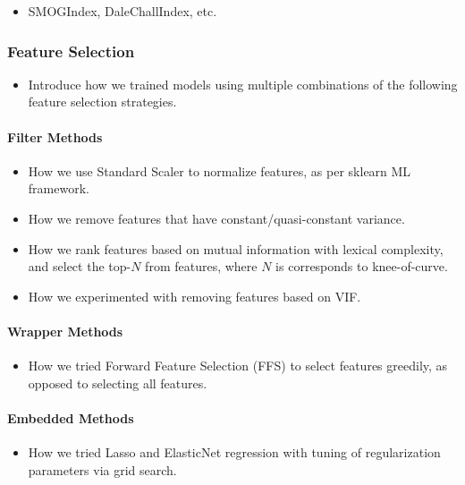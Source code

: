 \documentclass[11pt,a4paper]{article}
\begin{document}
\begin{itemize}
  \item SMOGIndex, DaleChallIndex, etc.
\end{itemize}

\subsubsection{Feature Selection}

\begin{itemize}
  \item Introduce how we trained models using multiple combinations of the following feature selection strategies.
\end{itemize}

\paragraph{Filter Methods}

\begin{itemize}
  \item How we use Standard Scaler to normalize features, as per sklearn ML framework.
  \item How we remove features that have constant/quasi-constant variance.
  \item How we rank features based on mutual information with lexical complexity, and select the top-$N$ from features, where $N$ is corresponds to knee-of-curve.
  \item How we experimented with removing features based on VIF.
\end{itemize}

\paragraph{Wrapper Methods}

\begin{itemize}
  \item How we tried Forward Feature Selection (FFS) to select features greedily, as opposed to selecting all features.
\end{itemize}

\paragraph{Embedded Methods}

\begin{itemize}
  \item How we tried Lasso and ElasticNet regression with tuning of regularization parameters via grid search.
\end{itemize}
\end{document}
